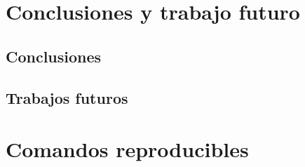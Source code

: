 \documentclass[12pt,oneside]{report}
\begin{document}
\chapter{Conclusiones y trabajo futuro}

\section{Conclusiones}

\mbox{}

\section{Trabajos futuros}

\mbox{}

\appendix

\chapter{Comandos reproducibles}

\mbox{}
\end{document}
